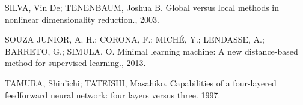 \documentclass{beamer}
\begin{document}
\begin{frame}[allowframebreaks]
\begin{thebibliography}{10}
		SILVA, Vin De; TENENBAUM, Joshua B.
		\newblock Global versus local methods in nonlinear dimensionality reduction.,
		2003.

		SOUZA JUNIOR, A. H.; CORONA, F.; MICHÉ, Y.; LENDASSE, A.; BARRETO, G.; SIMULA, O.
		\newblock Minimal learning machine: A new distance-based method for supervised learning.,
		2013.
		
		TAMURA, Shin'ichi; TATEISHI, Masahiko.
		\newblock Capabilities of a four-layered feedforward neural network: four layers versus three.
		1997.
		
\end{thebibliography}
\end{frame}




\end{document}

